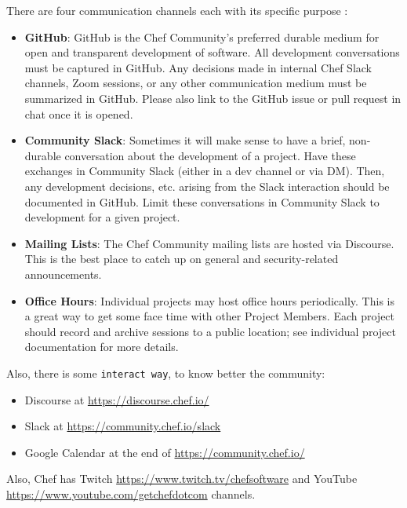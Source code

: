 \documentclass[12pt,a4paper,openright,twoside]{book}
\begin{document}
There are four communication channels each with its specific purpose \cite{chefGithubOSSCom}:


\begin{itemize}
    \item \textbf{GitHub}: GitHub is the Chef Community's preferred durable medium for open and transparent development of software. All development conversations must be captured in GitHub. Any decisions made in internal Chef Slack channels, Zoom sessions, or any other communication medium must be summarized in GitHub. Please also link to the GitHub issue or pull request in chat once it is opened.
    \item \textbf{Community Slack}: Sometimes it will make sense to have a brief, non-durable conversation about the development of a project. Have these exchanges in Community Slack (either in a dev channel or via DM). Then, any development decisions, etc. arising from the Slack interaction should be documented in GitHub. Limit these conversations in Community Slack to development for a given project.
    \item \textbf{Mailing Lists}: The Chef Community mailing lists are hosted via Discourse. This is the best place to catch up on general and security-related announcements.
    \item \textbf{Office Hours}: Individual projects may host office hours periodically. This is a great way to get some face time with other Project Members. Each project should record and archive sessions to a public location; see individual project documentation for more details.
\end{itemize}

Also, there is some \texttt{interact way}, to know better the community:

\begin{itemize}
    \item Discourse\newline
    at \url{https://discourse.chef.io/}
    \item Slack\newline
    at \url{https://community.chef.io/slack}
    \item Google Calendar\newline
    at the end of \url{https://community.chef.io/}
\end{itemize}

Also, Chef has Twitch \url{https://www.twitch.tv/chefsoftware} and YouTube \url{https://www.youtube.com/getchefdotcom} channels.
\end{document}
